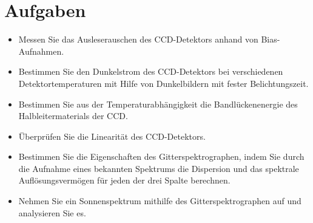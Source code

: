 \section{Aufgaben} %
\label{sec:aufgaben}

	\begin{itemize}
		\item
			Messen Sie das Ausleserauschen des CCD-Detektors anhand von Bias-Aufnahmen.
		\item 
			Bestimmen Sie den Dunkelstrom des CCD-Detektors bei verschiedenen Detektortemperaturen mit Hilfe von Dunkelbildern mit fester Belichtungszeit. 
		\item
			Bestimmen Sie aus der Temperaturabhängigkeit die Bandlückenenergie des Halbleitermaterials der CCD.
		\item
			Überprüfen Sie die Linearität des CCD-Detektors.
		\item
			Bestimmen Sie die Eigenschaften des Gitterspektrographen, indem Sie durch die Aufnahme eines bekannten Spektrums die Dispersion und das spektrale Auflösungsvermögen für jeden der drei Spalte berechnen.
		\item
			Nehmen Sie ein Sonnenspektrum mithilfe des Gitterspektrographen auf und analysieren Sie es.
	\end{itemize}

